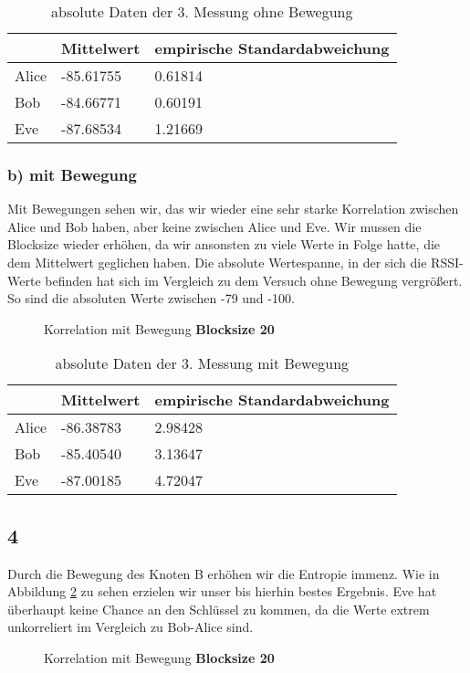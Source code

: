 \documentclass[12pt,a4paper]{article}
\begin{document}
\begin{table}[H]
\centering
\begin{tabular}{l|l|l}
& Mittelwert & empirische Standardabweichung \\
\hline
Alice & -85.61755 & 0.61814 \\
\hline
Bob & -84.66771 & 0.60191 \\
\hline
Eve & -87.68534 & 1.21669 \\
\end{tabular}
\caption{absolute Daten der 3. Messung ohne Bewegung}
\end{table}

\subsubsection*{b) mit Bewegung}
Mit Bewegungen sehen wir, das wir wieder eine sehr starke Korrelation zwischen Alice und Bob haben, aber keine zwischen Alice und Eve. Wir mussen die Blocksize wieder erhöhen, da wir ansonsten zu viele Werte in Folge hatte, die dem Mittelwert geglichen haben. Die absolute Wertespanne, in der sich die RSSI-Werte befinden hat sich im Vergleich zu dem Versuch ohne Bewegung vergrößert. So sind die absoluten Werte zwischen -79 und -100.
\begin{figure}[H]
\centering
{} \qquad
{}
\caption{Korrelation mit Bewegung \textbf{Blocksize 20}}
\label{fig:3_b_m}
\end{figure}

\begin{table}[H]
\centering
\begin{tabular}{l|l|l}
& Mittelwert & empirische Standardabweichung \\
\hline
Alice & -86.38783 & 2.98428 \\
\hline
Bob & -85.40540 & 3.13647 \\
\hline
Eve & -87.00185 & 4.72047 \\
\end{tabular}
\caption{absolute Daten der 3. Messung mit Bewegung}
\end{table}

\subsection*{4}
Durch die Bewegung des Knoten B erhöhen wir die Entropie immenz. Wie in Abbildung \ref{fig:4} zu sehen erzielen wir unser bis hierhin bestes Ergebnis. Eve hat überhaupt keine Chance an den Schlüssel zu kommen, da die Werte extrem unkorreliert im Vergleich zu Bob-Alice sind.
\begin{figure}[H]
\centering
{} \qquad
{}
\caption{Korrelation mit Bewegung \textbf{Blocksize 20}}
\label{fig:4}
\end{figure}
\end{document}
